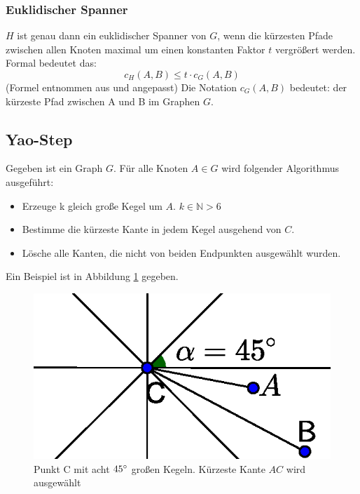 \documentclass[a4paper,twoside]{IEEEtran}
\begin{document}
\subsubsection{Euklidischer Spanner}
$H $ ist genau dann ein euklidischer Spanner von $G $, wenn die kürzesten Pfade zwischen allen Knoten maximal um einen konstanten Faktor $t $ vergrößert werden.
Formal bedeutet das:
\begin{equation}
	c_H(A, B) \leq t \cdot c_G(A, B)
\end{equation}
{\footnotesize (Formel entnommen aus \cite{kanj} und angepasst)}
Die Notation $c_{G}(A, B) $ bedeutet: der kürzeste Pfad zwischen A und B im Graphen $G $.

\subsection{Yao-Step}
Gegeben ist ein Graph $G $. Für alle Knoten $A \in G $ wird folgender Algorithmus ausgeführt:
\begin{itemize}
\item Erzeuge k gleich große Kegel um $A $. $k \in \mathds{N} > 6 $
\item Bestimme die kürzeste Kante in jedem Kegel ausgehend von $C $.
\item Lösche alle Kanten, die nicht von beiden Endpunkten ausgewählt wurden.
\end{itemize}
Ein Beispiel ist in Abbildung \ref{fig:YaoStep2} gegeben.

\begin{figure}
\centering
\includegraphics[width=0.99\linewidth]{Yao_Step2.eps}
\caption{Punkt C mit acht $45\degree $ großen Kegeln. Kürzeste Kante $AC $ wird ausgewählt}
\label{fig:YaoStep2}
\end{figure}


\end{document}
